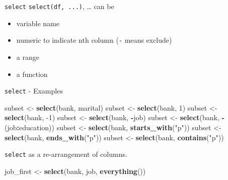 \documentclass[
  10pt,
  ignorenonframetext,
  serif]{beamer}
\newenvironment{Shaded}{\begin{snugshade}}{\end{snugshade}}
\newcommand{\DecValTok}[1]{\textcolor[rgb]{0.00,0.00,0.81}{#1}}
\newcommand{\KeywordTok}[1]{\textcolor[rgb]{0.13,0.29,0.53}{\textbf{#1}}}
\newcommand{\NormalTok}[1]{#1}
\newcommand{\OperatorTok}[1]{\textcolor[rgb]{0.81,0.36,0.00}{\textbf{#1}}}
\newcommand{\StringTok}[1]{\textcolor[rgb]{0.31,0.60,0.02}{#1}}
\providecommand{\tightlist}{%
  \setlength{\itemsep}{0pt}\setlength{\parskip}{0pt}}
\begin{document}
\begin{frame}[fragile]{\texttt{select}}
\protect\hypertarget{select}{}
\texttt{select(df,\ ...)}, \ldots{} can be

\begin{itemize}
\tightlist
\item
  variable name
\item
  numeric to indicate nth column (\texttt{-} means exclude)
\item
  a range
\item
  a function
\end{itemize}
\end{frame}

\begin{frame}[fragile]{\texttt{select} - Examples}
\protect\hypertarget{select---examples}{}
\begin{Shaded}
\begin{Highlighting}[]
\NormalTok{subset \textless{}{-}}\StringTok{ }\KeywordTok{select}\NormalTok{(bank, marital)}
\NormalTok{subset \textless{}{-}}\StringTok{ }\KeywordTok{select}\NormalTok{(bank, }\DecValTok{1}\NormalTok{)}
\NormalTok{subset \textless{}{-}}\StringTok{ }\KeywordTok{select}\NormalTok{(bank, }\DecValTok{{-}1}\NormalTok{)}
\NormalTok{subset \textless{}{-}}\StringTok{ }\KeywordTok{select}\NormalTok{(bank, }\OperatorTok{{-}}\NormalTok{job)}
\NormalTok{subset \textless{}{-}}\StringTok{ }\KeywordTok{select}\NormalTok{(bank, }\OperatorTok{{-}}\NormalTok{(job}\OperatorTok{:}\NormalTok{education))}
\NormalTok{subset \textless{}{-}}\StringTok{ }\KeywordTok{select}\NormalTok{(bank, }\KeywordTok{starts\_with}\NormalTok{(}\StringTok{"p"}\NormalTok{))}
\NormalTok{subset \textless{}{-}}\StringTok{ }\KeywordTok{select}\NormalTok{(bank, }\KeywordTok{ends\_with}\NormalTok{(}\StringTok{"p"}\NormalTok{))}
\NormalTok{subset \textless{}{-}}\StringTok{ }\KeywordTok{select}\NormalTok{(bank, }\KeywordTok{contains}\NormalTok{(}\StringTok{"p"}\NormalTok{))}
\end{Highlighting}
\end{Shaded}
\end{frame}

\begin{frame}[fragile]{\texttt{select} as a re-arrangement of columns.}
\protect\hypertarget{select-as-a-re-arrangement-of-columns.}{}
\begin{Shaded}
\begin{Highlighting}[]
\NormalTok{job\_first \textless{}{-}}\StringTok{ }\KeywordTok{select}\NormalTok{(bank, job, }\KeywordTok{everything}\NormalTok{())}
\end{Highlighting}
\end{Shaded}
\end{frame}
\end{document}
